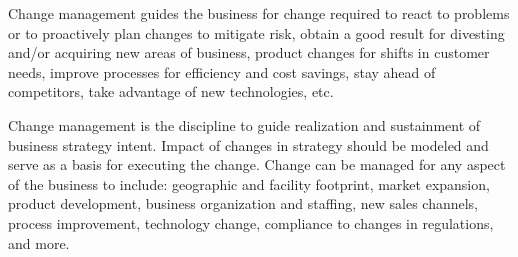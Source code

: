 %
%

Change management guides the business for change required to react to problems or to proactively plan changes to
mitigate risk, obtain a good result for divesting and/or acquiring new areas of business, product changes for
shifts in customer needs, improve processes for efficiency and cost savings, stay ahead of competitors,
take advantage of new technologies, etc.

Change management is the discipline to guide realization and sustainment of business strategy intent.
Impact of changes in strategy should be modeled and serve as a basis for executing the change.
Change can be managed for any aspect of the business to include: geographic and facility footprint, market expansion,
product development, business organization and staffing, new sales channels, process improvement, technology change,
compliance to changes in regulations, and more.